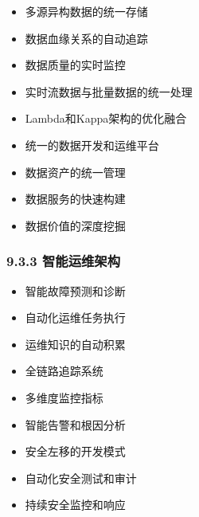 
\begin{itemize}
\tightlist
\item
  多源异构数据的统一存储
\item
  数据血缘关系的自动追踪
\item
  数据质量的实时监控
\end{itemize}


\begin{itemize}
\tightlist
\item
  实时流数据与批量数据的统一处理
\item
  Lambda和Kappa架构的优化融合
\item
  统一的数据开发和运维平台
\end{itemize}


\begin{itemize}
\tightlist
\item
  数据资产的统一管理
\item
  数据服务的快速构建
\item
  数据价值的深度挖掘
\end{itemize}

\hypertarget{ux667aux80fdux8fd0ux7ef4ux67b6ux6784}{%
\subsubsection{9.3.3 智能运维架构}\label{ux667aux80fdux8fd0ux7ef4ux67b6ux6784}}


\begin{itemize}
\tightlist
\item
  智能故障预测和诊断
\item
  自动化运维任务执行
\item
  运维知识的自动积累
\end{itemize}


\begin{itemize}
\tightlist
\item
  全链路追踪系统
\item
  多维度监控指标
\item
  智能告警和根因分析
\end{itemize}


\begin{itemize}
\tightlist
\item
  安全左移的开发模式
\item
  自动化安全测试和审计
\item
  持续安全监控和响应
\end{itemize}

